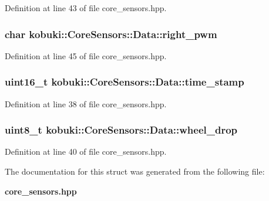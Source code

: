 \-Definition at line 43 of file core\-\_\-sensors.\-hpp.

\subsubsection[{right\-\_\-pwm}]{\setlength{\rightskip}{0pt plus 5cm}char {\bf kobuki\-::\-Core\-Sensors\-::\-Data\-::right\-\_\-pwm}}\label{structkobuki_1_1CoreSensors_1_1Data_a7a32588b92f15eff9cef99ebe2d600b2}


\-Definition at line 45 of file core\-\_\-sensors.\-hpp.

\subsubsection[{time\-\_\-stamp}]{\setlength{\rightskip}{0pt plus 5cm}uint16\-\_\-t {\bf kobuki\-::\-Core\-Sensors\-::\-Data\-::time\-\_\-stamp}}\label{structkobuki_1_1CoreSensors_1_1Data_a2ef0c11257ef7a25c0691e87659e138b}


\-Definition at line 38 of file core\-\_\-sensors.\-hpp.

\subsubsection[{wheel\-\_\-drop}]{\setlength{\rightskip}{0pt plus 5cm}uint8\-\_\-t {\bf kobuki\-::\-Core\-Sensors\-::\-Data\-::wheel\-\_\-drop}}\label{structkobuki_1_1CoreSensors_1_1Data_a47fa534f8b8da4ef4dfed6ecdaa9e2e5}


\-Definition at line 40 of file core\-\_\-sensors.\-hpp.



\-The documentation for this struct was generated from the following file\-:\begin{DoxyCompactItemize}
\item 
{\bf core\-\_\-sensors.\-hpp}\end{DoxyCompactItemize}
